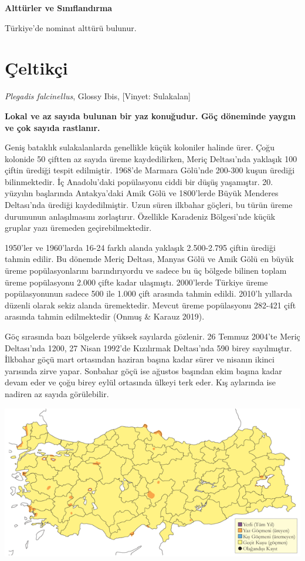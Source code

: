 \documentclass[
  letterpaper,
  DIV=11,
  numbers=noendperiod]{scrreprt}
\begin{document}
\textbf{Alttürler ve Sınıflandırma}

Türkiye'de nominat alttürü bulunur.

\section{Çeltikçi}\label{uxe7eltikuxe7i}

\emph{Plegadis falcinellus}, Glossy Ibis, {[}Vinyet: Sulakalan{]}

\textbf{Lokal ve az sayıda bulunan bir yaz konuğudur. Göç döneminde
yaygın ve çok sayıda rastlanır.}

Geniş bataklık sulakalanlarda genellikle küçük koloniler halinde ürer.
Çoğu kolonide 50 çiftten az sayıda üreme kaydedilirken, Meriç
Deltası'nda yaklaşık 100 çiftin ürediği tespit edilmiştir. 1968'de
Marmara Gölü'nde 200-300 kuşun ürediği bilinmektedir. İç Anadolu'daki
popülasyonu ciddi bir düşüş yaşamıştır. 20. yüzyılın başlarında
Antakya'daki Amik Gölü ve 1800'lerde Büyük Menderes Deltası'nda ürediği
kaydedilmiştir. Uzun süren ilkbahar göçleri, bu türün üreme durumunun
anlaşılmasını zorlaştırır. Özellikle Karadeniz Bölgesi'nde küçük gruplar
yazı üremeden geçirebilmektedir.

1950'ler ve 1960'larda 16-24 farklı alanda yaklaşık 2.500-2.795 çiftin
ürediği tahmin edilir. Bu dönemde Meriç Deltası, Manyas Gölü ve Amik
Gölü en büyük üreme popülasyonlarını barındırıyordu ve sadece bu üç
bölgede bilinen toplam üreme popülasyonu 2.000 çifte kadar ulaşmıştı.
2000'lerde Türkiye üreme popülasyonunun sadece 500 ile 1.000 çift
arasında tahmin edildi. 2010'lı yıllarda düzenli olarak sekiz alanda
üremektedir. Mevcut üreme popülasyonu 282-421 çift arasında tahmin
edilmektedir (Onmuş \& Karauz 2019).

Göç sırasında bazı bölgelerde yüksek sayılarda gözlenir. 26 Temmuz
2004'te Meriç Deltası'nda 1200, 27 Nisan 1992'de Kızılırmak Deltası'nda
590 birey sayılmıştır. İlkbahar göçü mart ortasından haziran başına
kadar sürer ve nisanın ikinci yarısında zirve yapar. Sonbahar göçü ise
ağustos başından ekim başına kadar devam eder ve çoğu birey eylül
ortasında ülkeyi terk eder. Kış aylarında ise nadiren az sayıda
görülebilir.

\includegraphics{images/harita_Page_062.png}
\end{document}
